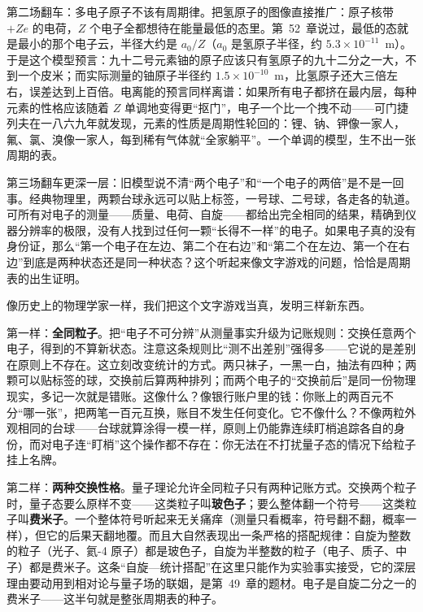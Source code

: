 第二场翻车：多电子原子不该有周期律。把氢原子的图像直接推广：原子核带 \(+Ze\) 的电荷，\(Z\) 个电子全都想待在能量最低的态里。第~52~章说过，最低的态就是最小的那个电子云，半径大约是 \(a_0/Z\)（\(a_0\) 是氢原子半径，约 \(5.3\times10^{-11}\)~m）。于是这个模型预言：九十二号元素铀的原子应该只有氢原子的九十二分之一大，不到一个皮米；而实际测量的铀原子半径约 \(1.5\times10^{-10}\)~m，比氢原子还大三倍左右，误差达到上百倍。电离能的预言同样离谱：如果所有电子都挤在最内层，每种元素的性格应该随着 \(Z\) 单调地变得更“抠门”，电子一个比一个拽不动——可门捷列夫在一八六九年就发现，元素的性质是周期性轮回的：锂、钠、钾像一家人，氟、氯、溴像一家人，每到稀有气体就“全家躺平”。一个单调的模型，生不出一张周期的表。

第三场翻车更深一层：旧模型说不清“两个电子”和“一个电子的两倍”是不是一回事。经典物理里，两颗台球永远可以贴上标签，一号球、二号球，各走各的轨道。可所有对电子的测量——质量、电荷、自旋——都给出完全相同的结果，精确到仪器分辨率的极限，没有人找到过任何一颗“长得不一样”的电子。如果电子真的没有身份证，那么“第一个电子在左边、第二个在右边”和“第二个在左边、第一个在右边”到底是两种状态还是同一种状态？这个听起来像文字游戏的问题，恰恰是周期表的出生证明。


像历史上的物理学家一样，我们把这个文字游戏当真，发明三样新东西。

第一样：\textbf{全同粒子}。把“电子不可分辨”从测量事实升级为记账规则：交换任意两个电子，得到的不算新状态。注意这条规则比“测不出差别”强得多——它说的是差别在原则上不存在。这立刻改变统计的方式。两只袜子，一黑一白，抽法有四种；两颗可以贴标签的球，交换前后算两种排列；而两个电子的“交换前后”是同一份物理现实，多记一次就是错账。这像什么？像银行账户里的钱：你账上的两百元不分“哪一张”，把两笔一百元互换，账目不发生任何变化。它不像什么？不像两粒外观相同的台球——台球就算涂得一模一样，原则上仍能靠连续盯梢追踪各自的身份，而对电子连“盯梢”这个操作都不存在：你无法在不打扰量子态的情况下给粒子挂上名牌。

第二样：\textbf{两种交换性格}。量子理论允许全同粒子只有两种记账方式。交换两个粒子时，量子态要么原样不变——这类粒子叫\textbf{玻色子}；要么整体翻一个符号——这类粒子叫\textbf{费米子}。一个整体符号听起来无关痛痒（测量只看概率，符号翻不翻，概率一样），但它的后果天翻地覆。而且大自然表现出一条严格的搭配规律：自旋为整数的粒子（光子、氦-4 原子）都是玻色子，自旋为半整数的粒子（电子、质子、中子）都是费米子。这条“自旋—统计搭配”在这里只能作为实验事实接受，它的深层理由要动用到相对论与量子场的联姻，是第~49~章的题材。电子是自旋二分之一的费米子——这半句就是整张周期表的种子。

